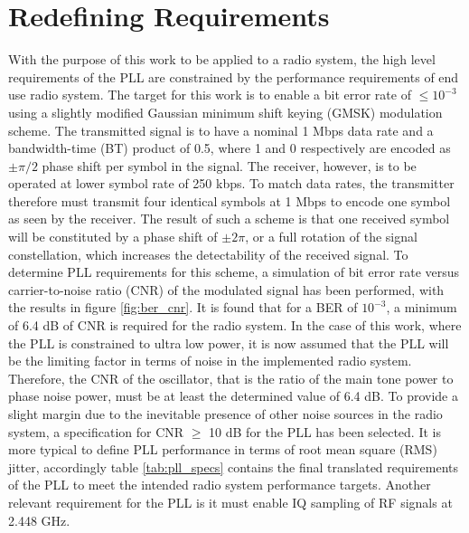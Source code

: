 	\section{Redefining Requirements}
	With the purpose of this work to be applied to a radio system, the high level requirements of the PLL are constrained by the performance requirements of end use radio system. The target for this work is to enable a bit error rate of $\leq 10^{-3}$ using a slightly modified Gaussian minimum shift keying (GMSK) \cite{rappaport_wireless_2002} modulation scheme. The transmitted signal is to have a nominal 1 Mbps data rate and a bandwidth-time (BT) product of 0.5, where 1 and 0 respectively are encoded as $\pm \pi/2$ phase shift per symbol in the signal. The receiver, however, is to be operated at lower symbol rate of 250 kbps. To match data rates, the transmitter therefore must transmit four identical symbols at 1 Mbps to encode one symbol as seen by the receiver. The result of such a scheme is that one received symbol will be constituted by a phase shift of $\pm 2\pi$, or a full rotation of the signal constellation, which increases the detectability of the received signal. To determine PLL requirements for this scheme, a simulation of bit error rate versus carrier-to-noise ratio (CNR) of the modulated signal has been performed, with the results in figure \ref{fig:ber_cnr}. It is found that for a BER of $10^{-3}$, a minimum of 6.4 dB of CNR is required for the radio system. In the case of this work, where the PLL is constrained to ultra low power, it is now assumed that the PLL will be the limiting factor in terms of noise in the implemented radio system. Therefore, the CNR of the oscillator, that is the ratio of the main tone power to phase noise power, must be at least the determined value of 6.4 dB. To provide a slight margin due to the inevitable presence of other noise sources in the radio system, a specification for CNR $\geq$ 10 dB for the PLL has been selected. It is more typical to define PLL performance in terms of root mean square (RMS) jitter, accordingly table \ref{tab:pll_specs} contains the final translated requirements of the PLL to meet the intended radio system performance targets. Another relevant requirement for the PLL is it must enable IQ sampling of RF signals at 2.448 GHz.




